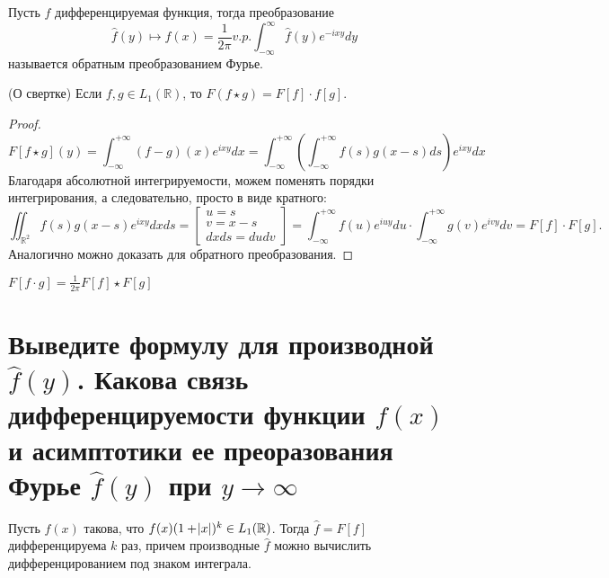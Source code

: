 \begin{definition}
    Пусть $f$ дифференцируемая функция, тогда преобразование
        $$\hat{f}(y) \mapsto f(x) = \frac{1}{2\pi} v.p.\int_{-\infty}^{\infty}\hat{f}(y)e^{-ixy}dy$$
    называется обратным преобразованием Фурье.
\end{definition}

\begin{theorem} (О свертке)
    Если $f, g\in L_1(\mathbb{R})$, то $F(f\star g) = F[f]\cdot f[g]$.
\end{theorem}
\begin{proof}
    $$
    F[f\star g](y) = \int_{-\infty}^{+\infty}(f - g)(x)e^{ixy}dx = \int_{-\infty}^{+\infty}\left(\int_{-\infty}^{+\infty}f(s)g(x - s)ds\right)e^{ixy}dx
    $$
    Благодаря абсолютной интегрируемости, можем поменять порядки интегрирования, а следовательно, просто в виде кратного:
    $$
    \iint_{\mathbb{R}^2} f(s)g(x - s)e^{ixy}dxds
    =
    \begin{bmatrix}
        u = s \\
        v = x - s \\
        dxds = dudv
    \end{bmatrix}
    =
    \int_{-\infty}^{+\infty} f(u)e^{iuy}du\cdot \int_{-\infty}^{+\infty} g(v)e^{ivy}dv = F[f] \cdot F[g].
    $$
    Аналогично можно доказать для обратного преобразования.
\end{proof}

\begin{corollary}
    $F[f\cdot g] = \frac{1}{2\pi}F[f]\star F[g]$
\end{corollary}

\section{Выведите формулу для производной $\hat{f}(y)$. Какова связь дифференцируемости функции $f(x)$ и асимптотики ее преоразования Фурье $\hat{f}(y)$ при $y\to\infty$}

\begin{statement}
    Пусть $f(x)$ такова, что $f(x)(1 + \abs{x})^k\in L_1(\mathbb{R})$. Тогда $\hat{f} = F[f]$ дифференцируема $k$ раз, причем производные $\hat{f}$ можно вычислить дифференцированием под знаком интеграла.
\end{statement}

